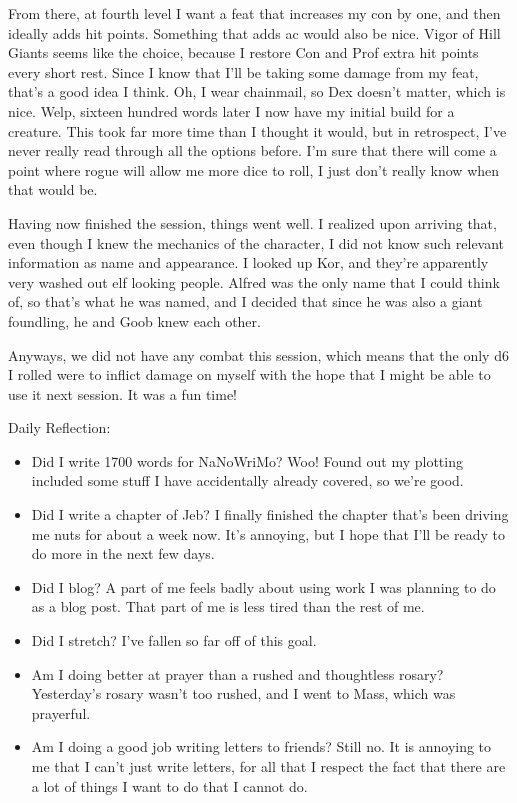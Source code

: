 \documentclass[12pt]{article}[titlepage]
\renewcommand{\,}{\textsuperscript{,}}
\begin{document}
From there, at fourth level I want a feat that increases my con by one, and then ideally adds hit points. Something that adds ac would also be nice.
Vigor of Hill Giants seems like the choice, because I restore Con and Prof extra hit points every short rest.
Since I know that I'll be taking some damage from my feat, that's a good idea I think.
Oh, I wear chainmail, so Dex doesn't matter, which is nice.
Welp, sixteen hundred words later I now have my initial build for a creature.
This took far more time than I thought it would, but in retrospect, I've never really read through all the options before.
I'm sure that there will come a point where rogue will allow me more dice to roll, I just don't really know when that would be.

Having now finished the session, things went well.
I realized upon arriving that, even though I knew the mechanics of the character, I did not know such relevant information as name and appearance.
I looked up Kor, and they're apparently very washed out elf looking people.
Alfred was the only name that I could think of, so that's what he was named, and I decided that since he was also a giant foundling, he and Goob knew each other.

Anyways, we did not have any combat this session, which means that the only d6 I rolled were to inflict damage on myself with the hope that I might be able to use it next session.
It was a fun time!

Daily Reflection:
\begin{itemize}
\item Did I write 1700 words for NaNoWriMo? Woo! Found out my plotting included some stuff I have accidentally already covered, so we're good.
\item Did I write a chapter of Jeb? I finally finished the chapter that's been driving me nuts for about a week now.
It's annoying, but I hope that I'll be ready to do more in the next few days.
\item Did I blog? A part of me feels badly about using work I was planning to do as a blog post.
That part of me is less tired than the rest of me.
\item Did I stretch? I've fallen so far off of this goal.
\item Am I doing better at prayer than a rushed and thoughtless rosary? Yesterday's rosary wasn't too rushed, and I went to Mass, which was prayerful.
\item Am I doing a good job writing letters to friends? Still no. It is annoying to me that I can't just write letters, for all that I respect the fact that there are a lot of things I want to do that I cannot do.
\end{itemize}
\end{document}
